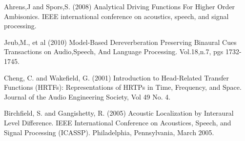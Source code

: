 \documentclass[12pt, letterpaper, draft]{article}
\begin{document}
Ahrens,J and Spors,S. (2008) Analytical Driving Functions For Higher Order Ambisonics.  IEEE international conference on acoustics, speech, and signal processing.

Jeub,M., et al (2010) Model-Based Dereverberation Preserving Binaural
Cues Transactions on Audio,Speech, And Language Processing.
Vol.18,n.7, pgs 1732-1745.

Cheng, C. and Wakefield, G. (2001) Introduction to Head-Related
Transfer Functions (HRTFs): Representations of HRTPs in Time,
Frequency, and Space. Journal of the Audio Engineering Society, Vol 49
No. 4.

Birchfield, S. and Gangishetty, R. (2005) Acoustic Localization by
Interaural Level Difference. IEEE International Conference on
Acoustices, Speech, and Signal Processing (ICASSP). Philadelphia,
Pennsylvania, March 2005.
\end{document}
